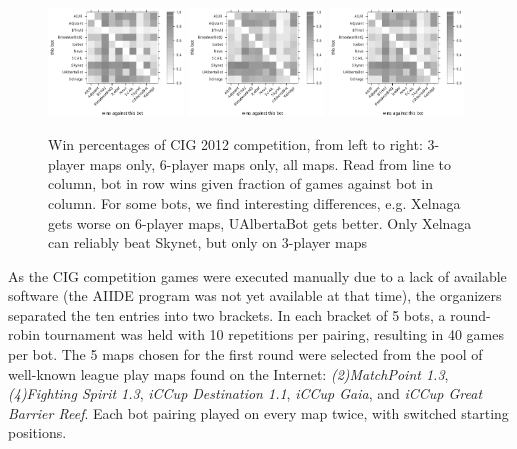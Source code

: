 \documentclass{llncs}
\begin{document}
\begin{figure}[b]
    \centering
    \includegraphics[width=0.32\textwidth]{figures/vstable3.pdf}
    \includegraphics[width=0.32\textwidth]{figures/vstable6.pdf}
    \includegraphics[width=0.32\textwidth]{figures/vstable.pdf}
    \caption{Win percentages of CIG 2012 competition, from left
    to right: 3-player maps only, 6-player maps only, all maps.
    Read from line to column, bot in row wins given fraction of
    games against bot in column. For some bots, we find interesting
    differences, e.g. Xelnaga gets worse on 6-player maps, UAlbertaBot
    gets better. Only Xelnaga can reliably beat Skynet, but only on 
    3-player maps}
    \label{fig:cig2012-mapresults}
\end{figure}

As the CIG competition games were executed manually due to
a lack of available software (the AIIDE program was not yet
available at that time), the organizers separated the ten entries into
two brackets. In each bracket of 5 bots, a round-robin
tournament was held with 10 repetitions per pairing, resulting
in 40 games per bot.
The 5 maps chosen for the first round were selected from the pool
of well-known league play maps found on the Internet:
\emph{(2)MatchPoint 1.3}, \emph{(4)Fighting Spirit 1.3}, 
\emph{iCCup Destination 1.1}, \emph{iCCup Gaia}, and 
\emph{iCCup Great Barrier Reef}. Each bot pairing played
on every map twice, with switched starting positions.
\end{document}
